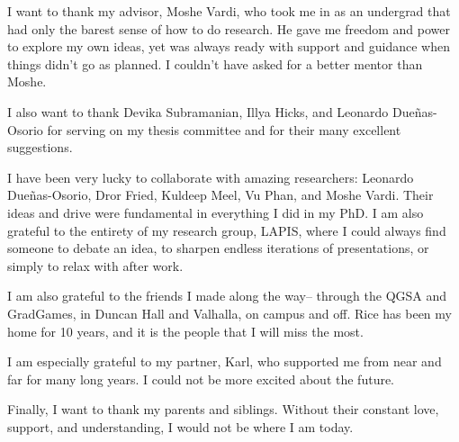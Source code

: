 \acknowledge
I want to thank my advisor, Moshe Vardi, who took me in as an undergrad that had only the barest sense of how to do research.
He gave me freedom and power to explore my own ideas, yet was always ready with support and guidance when things didn't go as planned.
I couldn't have asked for a better mentor than Moshe.

I also want to thank Devika Subramanian, Illya Hicks, and Leonardo Due{\~n}as-Osorio for serving on my thesis committee and for their many excellent suggestions.

I have been very lucky to collaborate with amazing researchers: Leonardo Due{\~n}as-Osorio, Dror Fried, Kuldeep Meel, Vu Phan, and Moshe Vardi.
Their ideas and drive were fundamental in everything I did in my PhD.
I am also grateful to the entirety of my research group, LAPIS, where I could always find someone to debate an idea, to sharpen endless iterations of presentations, or simply to relax with after work.

I am also grateful to the friends I made along the way-- through the QGSA and GradGames, in Duncan Hall and Valhalla, on campus and off. Rice has been my home for 10 years, and it is the people that I will miss the most.

I am especially grateful to my partner, Karl, who supported me from near and far for many long years. I could not be more excited about the future.

Finally, I want to thank my parents and siblings. Without their constant love, support, and understanding, I would not be where I am today.